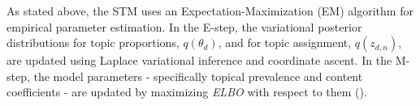 As stated above, the STM uses an Expectation-Maximization (EM) algorithm for empirical parameter estimation. In the E-step, the variational posterior distributions for topic proportions, $q(\theta_d)$, and for topic assignment, $q(z_{d,n})$, are updated using Laplace variational inference and coordinate ascent. In the M-step, the model parameters - specifically topical prevalence and content coefficients - are updated by maximizing \textit{ELBO} with respect to them (\citealp{roberts2016model}).